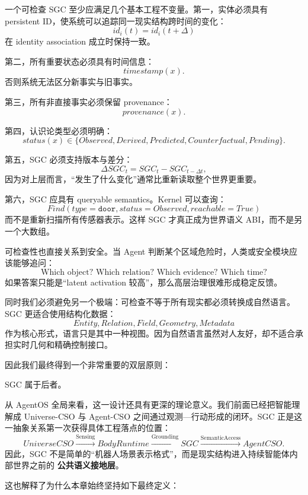 一个可检查 SGC 至少应满足几个基本工程不变量。第一，实体必须具有 persistent ID，使系统可以追踪同一现实结构跨时间的变化：
\[
id_i(t)=id_i(t+\Delta)
\]
在 identity association 成立时保持一致。

第二，所有重要状态必须具有时间信息：
\[
timestamp(x).
\]
否则系统无法区分新事实与旧事实。

第三，所有非直接事实必须保留 provenance：
\[
provenance(x).
\]

第四，认识论类型必须明确：
\[
status(x)
\in
\{
Observed,Derived,Predicted,Counterfactual,Pending
\}.
\]

第五，SGC 必须支持版本与差分：
\[
\Delta SGC_t
=
SGC_t-SGC_{t-\Delta t},
\]
因为对上层而言，“发生了什么变化”通常比重新读取整个世界更重要。

第六，SGC 应具有 queryable semantics。Kernel 可以查询：
\[
Find(
type=\texttt{door},
status=Observed,
reachable=True
)
\]
而不是重新扫描所有传感器表示。这样 SGC 才真正成为世界语义 ABI，而不是另一个大数组。

可检查性也直接关系到安全。当 Agent 判断某个区域危险时，人类或安全模块应该能够追问：
\[
\text{Which object? Which relation? Which evidence? Which time?}
\]
如果答案只能是“latent activation 较高”，那么高层治理很难形成稳定反馈。

同时我们必须避免另一个极端：可检查不等于所有现实都必须转换成自然语言。SGC 更适合使用结构化数据：
\[
Entity,
Relation,
Field,
Geometry,
Metadata
\]
作为核心形式，语言只是其中一种视图。因为自然语言虽然对人友好，却不适合承担实时几何和精确控制接口。

因此我们最终得到一个非常重要的双层原则：
\begin{statementbox}
\centering
{}
\end{statementbox}
SGC 属于后者。

从 AgentOS 全局来看，这一设计还具有更深的理论意义。我们前面已经把智能理解成 Universe-CSO 与 Agent-CSO 之间通过观测—行动形成的闭环。SGC 正是这一抽象关系第一次获得具体工程落点的位置：
\[
UniverseCSO
\xrightarrow{\text{Sensing}}
BodyRuntime
\xrightarrow{\text{Grounding}}
SGC
\xrightarrow{\text{SemanticAccess}}
AgentCSO .
\]
因此，SGC 不是简单的“机器人场景表示格式”，而是现实结构进入持续智能体内部世界之前的
\textbf{公共语义接地层}。

这也解释了为什么本章始终坚持如下最终定义：
\begin{statementbox}
\centering
{}
\end{statementbox}

